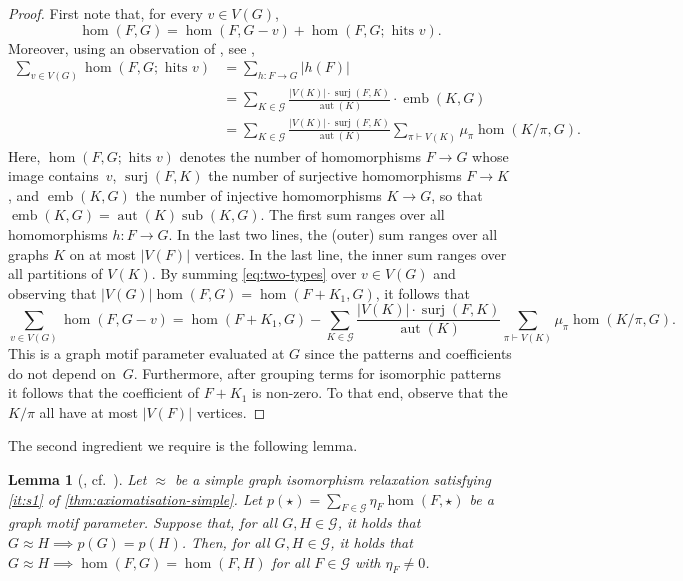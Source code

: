 \documentclass[11pt]{scrartcl}
\theoremstyle{definition}
\theoremstyle{plain}
\newtheorem{lemma}[definition]{Lemma}
\theoremstyle{remark}
\DeclareMathOperator{\aut}{aut}
\DeclareMathOperator{\surj}{surj}
\DeclareMathOperator{\sub}{sub}
\DeclareMathOperator{\emb}{emb}
\newcommand{\G}{\mathcal{G}}
\begin{document}
	
	\begin{proof}
		First note that, for every $v \in V(G)$,
		\begin{equation}\label{eq:two-types}
			\hom(F, G) = \hom(F, G - v) + \hom(F, G; \text{ hits } v).
		\end{equation}
		Moreover, using an observation of \textcite{lovasz_operations_1967}, see \cite[Lemma~3.1.2]{seppelt_homomorphism_2024},
		\begin{align*}
			\sum_{v \in V(G)} \hom(F, G; \text{ hits } v)
			&= \sum_{h \colon F\to G} |h(F)|  \\
			&= \sum_{K \in \G}  \frac{|V(K)| \cdot \surj(F, K)}{\aut(K)} \cdot \emb(K, G) \\
			&=   \sum_{K \in \G}  \frac{|V(K)| \cdot \surj(F, K)}{\aut(K)} \sum_{\pi \vdash V(K)} \mu_\pi \hom(K/\pi, G).
		\end{align*}
		Here, $\hom(F, G; \text{ hits } v)$ denotes the number of homomorphisms $F \to G$ whose image contains~$v$,
		$\surj(F, K)$ the number of surjective homomorphisms $F \to K$,
		and $\emb(K, G)$ the number of injective homomorphisms $K \to G$, so that $\emb(K, G) = \aut(K) \sub(K, G)$.
		The first sum ranges over all homomorphisms $h \colon F\to G$.
		In the last two lines, the (outer) sum ranges over all graphs $K$ on at most $|V(F)|$ vertices.
		In the last line, the inner sum ranges over all partitions of $V(K)$.
		By summing \cref{eq:two-types} over $v \in V(G)$ and observing that $|V(G)| \hom(F, G) = \hom(F + K_1, G)$, it follows that
		\begin{equation}\label{eq:ulam}
			\sum_{v\in V(G)} \hom(F, G  - v) = \hom(F + K_1, G)
			-  \sum_{K \in \G}  \frac{|V(K)| \cdot \surj(F, K)}{\aut(K)} \sum_{\pi \vdash V(K)} \mu_\pi \hom(K/\pi, G).
		\end{equation}
		This is a graph motif parameter evaluated at $G$ since the patterns and coefficients do not depend on~$G$. 
		Furthermore, after grouping terms for isomorphic patterns it follows that the coefficient of $F + K_1$ is non-zero.
		To that end, observe that the $K/\pi$ all have at most $|V(F)|$ vertices.
	\end{proof}

    The second ingredient we require is the following lemma.

    \begin{lemma}[{\cite[Lemma 6]{seppelt_logical_2024}, cf.\ \cite[Lemma 3.6]{curticapean_homomorphisms_2017}}]\label{lem:gmp-interpolation}
        Let $\approx$ be a simple graph isomorphism relaxation satisfying \cref{it:s1} of \cref{thm:axiomatisation-simple}.
        Let $p(\star) = \sum_{F \in \G} \eta_F \hom(F, \star)$ be a graph motif parameter.
        Suppose that, for all $G, H \in \G$, it holds that $G \approx H \implies p(G) = p(H)$.
        Then, for all $G, H \in \G$, it holds that $G \approx H \implies \hom(F, G) = \hom(F, H)$ for all $F \in \G$ with $\eta_F \neq 0$.
    \end{lemma}
    
\end{document}
